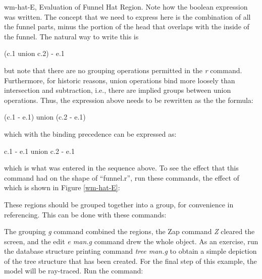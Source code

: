 \mfig wm-hat-E, Evaluation of Funnel Hat Region.
Note how the boolean expression was written.
The concept that we need to express here is
the combination of all the funnel parts, minus the
portion of the head that overlaps with the inside of the funnel.
The natural way to write this is
\begin{center}
(c.1 union c.2) - e.1
\end{center}
but note that there are no grouping operations permitted in the {\em r}
command.
Furthermore, for historic reasons, union operations bind more loosely than
intersection and subtraction, i.e., there are implied groups
between union operations.  Thus, the expression above needs to be
rewritten as the the formula:
\begin{center}
(c.1 - e.1) union (c.2 - e.1)
\end{center}
which with the binding precedence can be expressed as:
\begin{center}
c.1 - e.1 union c.2 - e.1
\end{center}
which is what was entered in the sequence above.
To see the effect that this command had on the shape of ``funnel.r'',
run these commands, the effect of which is shown in Figure \ref{wm-hat-E}:


These regions should be grouped together into a group,
for convenience in referencing.  This can be done with these commands:


The grouping {\em g} command combined the regions, the Zap command {\em Z}
cleared the screen, and the edit {\em e man.g} command drew the whole
object.
As an exercise, run
the database structure printing command {\em tree man.g}
to obtain a simple depiction of the tree structure that has been created.
For the final step of this example, the model will be ray-traced.
Run the command:

